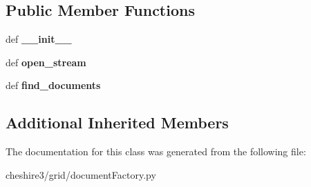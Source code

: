 \subsection*{Public Member Functions}
\begin{DoxyCompactItemize}
\item 
\hypertarget{classcheshire3_1_1grid_1_1document_factory_1_1_irods_directory_document_stream_a8ea41f427968c3838088a258409e22b6}{def {\bfseries \-\_\-\-\_\-init\-\_\-\-\_\-}}\label{classcheshire3_1_1grid_1_1document_factory_1_1_irods_directory_document_stream_a8ea41f427968c3838088a258409e22b6}

\item 
\hypertarget{classcheshire3_1_1grid_1_1document_factory_1_1_irods_directory_document_stream_aa012d8f556683ecc66dc1258902578ee}{def {\bfseries open\-\_\-stream}}\label{classcheshire3_1_1grid_1_1document_factory_1_1_irods_directory_document_stream_aa012d8f556683ecc66dc1258902578ee}

\item 
\hypertarget{classcheshire3_1_1grid_1_1document_factory_1_1_irods_directory_document_stream_af5cc609e13141cb087347eb7385c5550}{def {\bfseries find\-\_\-documents}}\label{classcheshire3_1_1grid_1_1document_factory_1_1_irods_directory_document_stream_af5cc609e13141cb087347eb7385c5550}

\end{DoxyCompactItemize}
\subsection*{Additional Inherited Members}


The documentation for this class was generated from the following file\-:\begin{DoxyCompactItemize}
\item 
cheshire3/grid/document\-Factory.\-py\end{DoxyCompactItemize}
